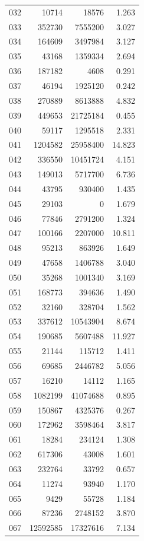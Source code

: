 \documentclass[anonymous,notoc]{gmcm2026}
\begin{document}
\begin{longtable}{lrrr}
032 & 10714 & 18576 & 1.263 \\
033 & 352730 & 7555200 & 3.027 \\
034 & 164609 & 3497984 & 3.127 \\
035 & 43168 & 1359334 & 2.694 \\
036 & 187182 & 4608 & 0.291 \\
037 & 46194 & 1925120 & 0.242 \\
038 & 270889 & 8613888 & 4.832 \\
039 & 449653 & 21725184 & 0.455 \\
040 & 59117 & 1295518 & 2.331 \\
041 & 1204582 & 25958400 & 14.823 \\
042 & 336550 & 10451724 & 4.151 \\
043 & 149013 & 5717700 & 6.736 \\
044 & 43795 & 930400 & 1.435 \\
045 & 29103 & 0 & 1.679 \\
046 & 77846 & 2791200 & 1.324 \\
047 & 100166 & 2207000 & 10.811 \\
048 & 95213 & 863926 & 1.649 \\
049 & 47658 & 1406788 & 3.040 \\
050 & 35268 & 1001340 & 3.169 \\
051 & 168773 & 394636 & 1.490 \\
052 & 32160 & 328704 & 1.562 \\
053 & 337612 & 10543904 & 8.674 \\
054 & 190685 & 5607488 & 11.927 \\
055 & 21144 & 115712 & 1.411 \\
056 & 69685 & 2446782 & 5.056 \\
057 & 16210 & 14112 & 1.165 \\
058 & 1082199 & 41074688 & 0.895 \\
059 & 150867 & 4325376 & 0.267 \\
060 & 172962 & 3598464 & 3.817 \\
061 & 18284 & 234124 & 1.308 \\
062 & 617306 & 43008 & 1.601 \\
063 & 232764 & 33792 & 0.657 \\
064 & 11274 & 93940 & 1.170 \\
065 & 9429 & 55728 & 1.184 \\
066 & 87236 & 2748152 & 3.870 \\
067 & 12592585 & 17327616 & 7.134 \\

\end{longtable}
\end{document}
